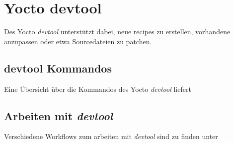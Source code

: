 \chapter{Yocto devtool}%
\label{cha:yocto_devtool}

Des Yocto \textit{devtool} unterstützt dabei, neue recipes zu erstellen,
vorhandene anzupassen oder etwa Sourcedateien zu patchen.

\section{devtool Kommandos}%
\label{sec:devtool_kommandos}

Eine Übersicht über die Kommandos des Yocto \textit{devtool} liefert
\cite[Seite
245]{Gonzalez2018:Embedded_Linux_Development_Using_Yocto_Project_Cookbook_2nd}

\section{Arbeiten mit \textit{devtool}}%
\label{sec:arbeiten_mit_devtool}

Verschiedene \glspl{Workflow} zum arbeiten mit \textit{devtool} sind zu finden
unter \cite[Seite 239-249]{Gonzalez2018:Embedded_Linux_Development_Using_Yocto_Project_Cookbook_2nd}

